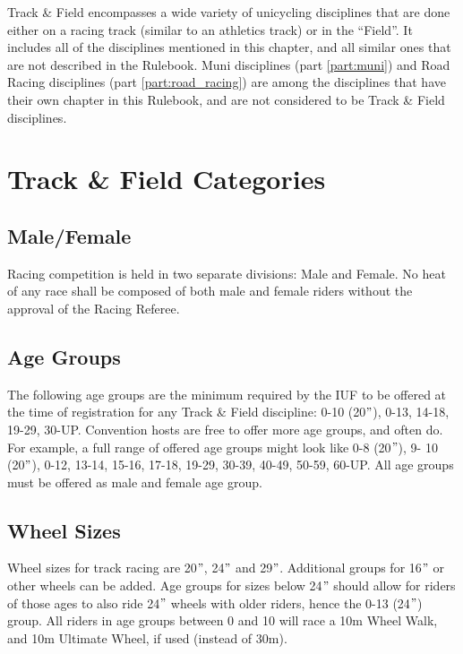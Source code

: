 
Track \& Field encompasses a wide variety of unicycling disciplines that are done either on a racing track (similar to an athletics track) or in the ``Field''.
It includes all of the disciplines mentioned in this chapter, and all similar ones that are not described in the Rulebook.
Muni disciplines (part \ref{part:muni}) and Road Racing disciplines (part \ref{part:road_racing}) are among the disciplines that have their own chapter in this Rulebook, and are not considered to be Track \& Field disciplines.

\section{Track \& Field Categories}

\subsection{Male/Female}
Racing competition is held in two separate divisions: Male and Female.
No heat of any race shall be composed of both male and female riders without the approval of the Racing Referee.

\subsection{Age Groups \label{subsec:track-field_racing-categories_age-groups}}
The following age groups are the minimum required by the IUF to be offered at the time of registration for any Track \& Field discipline: 0-10 (20$"$), 0-13, 14-18, 19-29, 30-UP.
Convention hosts are free to offer more age groups, and often do.
For example, a full range of offered age groups might look like 0-8 (20$"$), 9- 10 (20$"$), 0-12, 13-14, 15-16, 17-18, 19-29, 30-39, 40-49, 50-59, 60-UP.
All age groups must be offered as male and female age group.

\subsection{Wheel Sizes}
Wheel sizes for track racing are 20$"$, 24$"$ and 29$"$.
Additional groups for 16$"$ or other wheels can be added.
Age groups for sizes below 24$"$ should allow for riders of those ages to also ride 24$"$ wheels with older riders, hence the 0-13 (24$"$) group.
All riders in age groups between 0 and 10 will race a 10m Wheel Walk, and 10m Ultimate Wheel, if used (instead of 30m).

